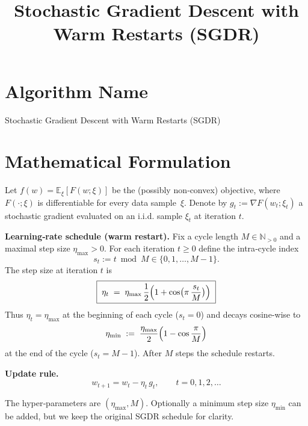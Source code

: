 \documentclass{article}
\begin{document}
\title{Stochastic Gradient Descent with Warm Restarts (SGDR)}
\author{}
\date{}
\maketitle

\tableofcontents
\newpage

\section*{Algorithm Name}
Stochastic Gradient Descent with Warm Restarts (SGDR)

\section*{Mathematical Formulation}
Let $f(w)=\mathbb{E}_{\xi}[F(w;\xi)]$ be the (possibly non‑convex) objective, where $F(\cdot;\xi)$ is differentiable for every data sample~$\xi$.  
Denote by $g_t:=\nabla F(w_t;\xi_t)$ a stochastic gradient evaluated on an i.i.d. sample $\xi_t$ at iteration $t$.

\bigskip
\noindent\textbf{Learning‑rate schedule (warm restart).}  
Fix a cycle length $M\in\mathbb{N}_{>0}$ and a maximal step size $\eta_{\max}>0$.  
For each iteration $t\ge 0$ define the intra‑cycle index 
\[
s_t:= t \bmod M \in\{0,1,\dots ,M-1\}.
\]
The step size at iteration $t$ is
\begin{equation}
\boxed{\;
\eta_t \;=\; \eta_{\max}\,\frac{1}{2}\Bigl(1+\cos\bigl(\pi\,\frac{s_t}{M}\bigr)\Bigr)
\;}\label{eq:sgdr-schedule}
\end{equation}
Thus $\eta_t=\eta_{\max}$ at the beginning of each cycle ($s_t=0$) and decays cosine‑wise to
\[
\eta_{\min}\;:=\;\frac{\eta_{\max}}{2}\Bigl(1-\cos\frac{\pi}{M}\Bigr)
\]
at the end of the cycle ($s_t=M-1$). After $M$ steps the schedule restarts.

\bigskip
\noindent\textbf{Update rule.}
\begin{equation}
\boxed{\;
w_{t+1}=w_t-\eta_t\,g_t,\qquad t=0,1,2,\dots
\;}\label{eq:update}
\end{equation}

The hyper‑parameters are $(\eta_{\max},M)$. Optionally a minimum step size $\eta_{\min}$ can be added, but we keep the original SGDR schedule for clarity.
\end{document}
